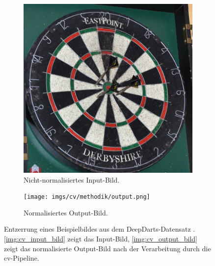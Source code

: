 \begin{figure}
    \centering
    \begin{subfigure}{0.45\textwidth}
        \centering
        \includegraphics[width=\textwidth]{imgs/cv/methodik/input.jpg}
        \caption{Nicht-normalisiertes Input-Bild.}
        \label{img:cv_input_bild}
    \end{subfigure}
    \hfill
    \begin{subfigure}{0.45\textwidth}
        \centering\texttt{[image: imgs/cv/methodik/output.png]}
        \caption{Normalisiertes Output-Bild.}
        \label{img:cv_output_bild}
    \end{subfigure}
    \caption{Entzerrung eines Beispielbildes aus dem DeepDarts-Datensatz \cite{deepdarts-data}. \autoref{img:cv_input_bild} zeigt das Input-Bild, \autoref{img:cv_output_bild} zeigt das normalisierte Output-Bild nach der Verarbeitung durch die \ac{cv}-Pipeline.}
    \label{img:cv_input_ouptut}
\end{figure}

